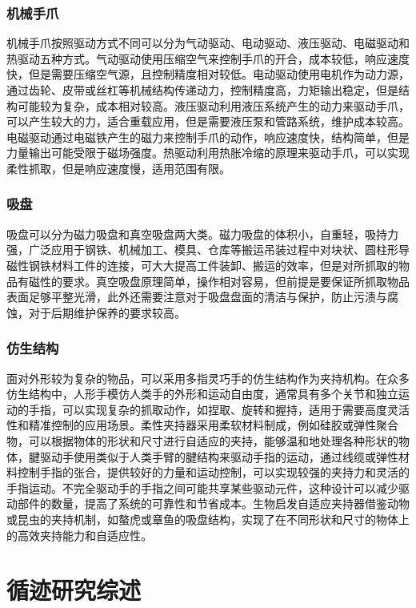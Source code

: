 \documentclass{paper}
\begin{document}
\subsubsection{机械手爪}
\label{subsec:label}
机械手爪按照驱动方式不同可以分为气动驱动、电动驱动、液压驱动、电磁驱动和热驱动五种方式。气动驱动使用压缩空气来控制手爪的开合，成本较低，响应速度快，但是需要压缩空气源，且控制精度相对较低。电动驱动使用电机作为动力源，通过齿轮、皮带或丝杠等机械结构传递动力，控制精度高，力矩输出稳定，但是结构可能较为复杂，成本相对较高。液压驱动利用液压系统产生的动力来驱动手爪，可以产生较大的力，适合重载应用，但是需要液压泵和管路系统，维护成本较高。电磁驱动通过电磁铁产生的磁力来控制手爪的动作，响应速度快，结构简单，但是力量输出可能受限于磁场强度。热驱动利用热胀冷缩的原理来驱动手爪，可以实现柔性抓取，但是响应速度慢，适用范围有限。

\subsubsection{吸盘}
\label{subsec:label}
吸盘可以分为磁力吸盘和真空吸盘两大类。磁力吸盘的体积小，自重轻，吸持力强，广泛应用于钢铁、机械加工、模具、仓库等搬运吊装过程中对块状、圆柱形导磁性钢铁材料工件的连接，可大大提高工件装卸、搬运的效率，但是对所抓取的物品有磁性的要求。真空吸盘原理简单，操作相对容易，但前提是要保证所抓取物品表面足够平整光滑，此外还需要注意对于吸盘盘面的清洁与保护，防止污渍与腐蚀，对于后期维护保养的要求较高。
\subsubsection{仿生结构}
\label{subsec:label}
面对外形较为复杂的物品，可以采用多指灵巧手的仿生结构作为夹持机构。在众多仿生结构中，人形手模仿人类手的外形和运动自由度，通常具有多个关节和独立运动的手指，可以实现复杂的抓取动作，如捏取、旋转和握持，适用于需要高度灵活性和精准控制的应用场景。柔性夹持器采用柔软材料制成，例如硅胶或弹性聚合物，可以根据物体的形状和尺寸进行自适应的夹持，能够温和地处理各种形状的物体，腱驱动手使用类似于人类手臂的腱结构来驱动手指的运动，通过线缆或弹性材料控制手指的张合，提供较好的力量和运动控制，可以实现较强的夹持力和灵活的手指运动。不完全驱动手的手指之间可能共享某些驱动元件，这种设计可以减少驱动部件的数量，提高了系统的可靠性和节省成本。生物启发自适应夹持器借鉴动物或昆虫的夹持机制，如螯虎或章鱼的吸盘结构，实现了在不同形状和尺寸的物体上的高效夹持能力和自适应性。


\section{循迹研究综述}
\end{document}
